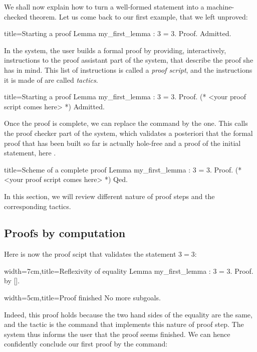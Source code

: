 

We shall now explain how to turn a well-formed statement into a
machine-checked theorem. Let us come back to our first example, that
we left unproved:
\begin{coq}{title=Starting a proof}
Lemma my_first_lemma : 3 = 3.
Proof.
Admitted.
\end{coq}
In the \Coq{} system, the user builds a formal proof by providing,
interactively, instructions to the proof assistant part of the \Coq{}
system, that describe the proof she has in mind. This list of
instructions is called a \emph{proof script}, and the instructions it
is made of are called \emph{tactics}.

\begin{coq}{title=Starting a proof}
Lemma my_first_lemma : 3 = 3.
Proof.
(* <your proof script comes here> *)
Admitted.
\end{coq}

Once the proof is complete, we can replace the  command by
the  one. This calls the proof checker part of  the \Coq{}
system, which validates a posteriori that the formal proof that has
been built so far is actually hole-free and a proof of the initial
statement, here .

\begin{coq}{title=Scheme of a complete proof}
Lemma my_first_lemma : 3 = 3.
Proof.
(* <your proof script comes here> *)
Qed.
\end{coq}

In this section, we will review different nature of proof steps and
the corresponding tactics.

\subsection{Proofs by computation}\label{ssec:proofcomp}

Here is now the proof scipt that validates the statement $3 = 3$:

\begin{coq}{width=7cm,title=Reflexivity of equality}
Lemma my_first_lemma : 3 = 3.
Proof. by [].
\end{coq}
\begin{coqout}{width=5cm,title=Proof finished}
No more subgoals.
$~$
\end{coqout}
Indeed, this proof holds because the two hand sides of the equality
are the same, and the tactic  is the command that
implements this nature of proof step. 
The system thus informs the user
that the proof seems finished. We can hence confidently conclude our
first proof by the  command:

